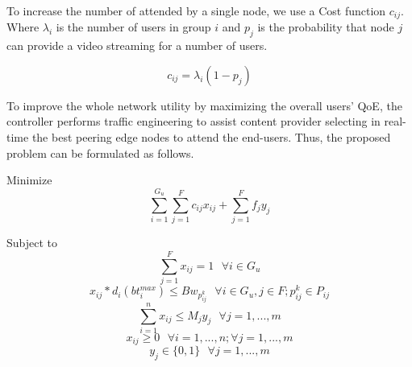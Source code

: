
To increase the number of attended by a single node, we use a Cost function $c_{ij}$. Where $\lambda_{i}$ is the number of users in group $i$ and $p_{j}$ is the probability that node $j$ can provide a video streaming for a number of users. 

\begin{equation}\label{cost_func}
c_{ij} = \lambda_{i} (1 - p_{j})
\end{equation}


To improve the whole network utility by maximizing the overall users' QoE, the controller performs traffic engineering to assist content provider selecting in real-time the best peering edge nodes to attend the end-users. Thus, the proposed problem can be formulated as follows.

Minimize
\begin{equation}
\sum^{G_u}_{i=1}\sum^{F}_{j=1} c_{ij}x_{ij} + \sum^{F}_{j=1} f_{j} y_{j} \label{eq:maximize}
\end{equation}

Subject to
\begin{equation}\label{bound_1}
\sum^{F}_{j=1} x_{ij} = 1 \text{ } \forall i \in G_u
\end{equation}
\begin{equation}\label{bound_3}
x_{ij} * d_{i}( bt_{i}^{max})
\leq Bw_{p_{ij}^{k}}
\text{ } \forall i \in G_u, j \in F; p_{ij}^{k} \in P_{ij} 
\end{equation}
\begin{equation}\label{bound_2}
\sum^{n}_{i=1} x_{ij} \leq M_{j}y_{j} \text{ } \forall j = 1,...,m
\end{equation}
\begin{equation}\label{bound_3}
x_{ij} \geq 0 \text{ } \forall i = 1,...,n; \forall j = 1,...,m
\end{equation}
\begin{equation}\label{bound_3}
y_{j} \in \{0,1\} \text{ } \forall j = 1,...,m
\end{equation}
\vspace{0.5cm}

